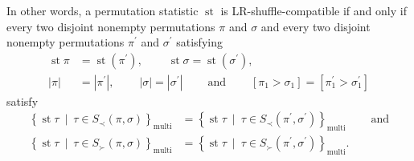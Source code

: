 \documentclass[numbers=enddot,12pt,final,onecolumn,notitlepage]{scrartcl}%
\theoremstyle{definition}
\begin{document}
In other words, a permutation statistic $\operatorname{st}$ is
LR-shuffle-compatible if and only if every two disjoint nonempty permutations
$\pi$ and $\sigma$ and every two disjoint nonempty permutations $\pi^{\prime}$
and $\sigma^{\prime}$ satisfying%
\begin{align*}
\operatorname{st} \pi    &  =\operatorname{st}\left(
\pi^{\prime}\right)  ,\ \ \ \ \ \ \ \ \ \ \operatorname{st} \sigma
=\operatorname{st}\left(  \sigma^{\prime}\right)  ,\\
\left\vert \pi\right\vert  &  =\left\vert \pi^{\prime}\right\vert
,\ \ \ \ \ \ \ \ \ \ \left\vert \sigma\right\vert =\left\vert \sigma^{\prime
}\right\vert \ \ \ \ \ \ \ \ \ \ \text{and}\ \ \ \ \ \ \ \ \ \ \left[  \pi
_{1}>\sigma_{1}\right]  =\left[  \pi_{1}^{\prime}>\sigma_{1}^{\prime}\right]
\end{align*}
satisfy
\begin{align*}
\left\{  \operatorname{st} \tau   \ \mid\ \tau\in S_{\prec
}\left(  \pi,\sigma\right)  \right\}  _{\operatorname*{multi}}  &  =\left\{
\operatorname{st} \tau   \ \mid\ \tau\in S_{\prec}\left(
\pi^{\prime},\sigma^{\prime}\right)  \right\}  _{\operatorname*{multi}%
}\ \ \ \ \ \ \ \ \ \ \text{and}\\
\left\{  \operatorname{st} \tau   \ \mid\ \tau\in S_{\succ
}\left(  \pi,\sigma\right)  \right\}  _{\operatorname*{multi}}  &  =\left\{
\operatorname{st} \tau   \ \mid\ \tau\in S_{\succ}\left(
\pi^{\prime},\sigma^{\prime}\right)  \right\}  _{\operatorname*{multi}}.
\end{align*}
\end{document}
